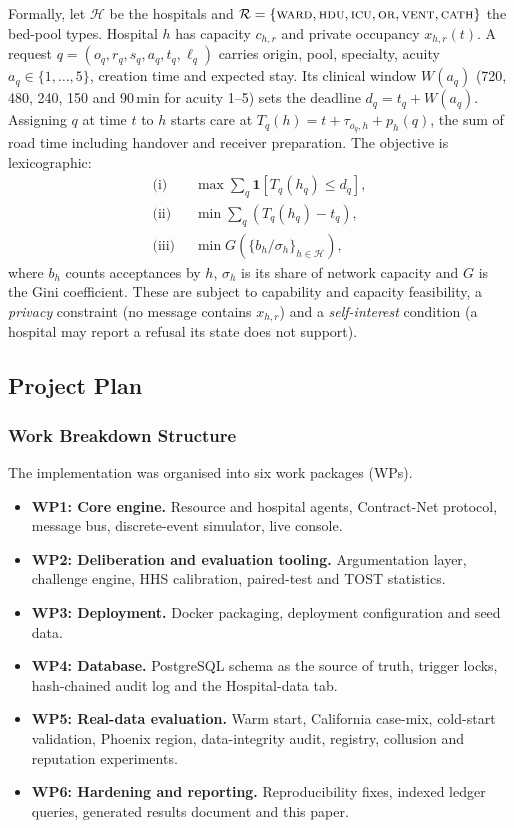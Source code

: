 Formally, let $\mathcal{H}$ be the hospitals and $\mathcal{R}=\{\textsc{ward},\textsc{hdu},\textsc{icu},\textsc{or},\textsc{vent},\textsc{cath}\}$ the bed-pool types. Hospital $h$ has capacity $c_{h,r}$ and private occupancy $x_{h,r}(t)$. A request $q=(o_q,r_q,s_q,a_q,t_q,\ell_q)$ carries origin, pool, specialty, acuity $a_q\in\{1,\dots,5\}$, creation time and expected stay. Its clinical window $W(a_q)$ (720, 480, 240, 150 and 90\,min for acuity 1--5) sets the deadline $d_q=t_q+W(a_q)$. Assigning $q$ at time $t$ to $h$ starts care at $T_q(h)=t+\tau_{o_q,h}+p_h(q)$, the sum of road time including handover and receiver preparation. The objective is lexicographic:
\begin{align}
  \text{(i)}\;\; & \max \textstyle\sum_{q} \mathbf{1}[T_q(h_q) \le d_q], \label{eq:obj1}\\
  \text{(ii)}\;\; & \min \textstyle\sum_{q} (T_q(h_q) - t_q), \label{eq:obj2}\\
  \text{(iii)}\;\; & \min G(\{b_h/\sigma_h\}_{h\in\mathcal{H}}), \label{eq:obj3}
\end{align}
where $b_h$ counts acceptances by $h$, $\sigma_h$ is its share of network capacity and $G$ is the Gini coefficient. These are subject to capability and capacity feasibility, a \emph{privacy} constraint (no message contains $x_{h,r}$) and a \emph{self-interest} condition (a hospital may report a refusal its state does not support).

\subsection{Project Plan}
\label{sec:plan}
\subsubsection{Work Breakdown Structure}
The implementation was organised into six work packages (WPs).
\begin{itemize}
\setlength{\itemsep}{1pt}
\item \textbf{WP1: Core engine.} Resource and hospital agents, Contract-Net protocol, message bus, discrete-event simulator, live console.
\item \textbf{WP2: Deliberation and evaluation tooling.} Argumentation layer, challenge engine, HHS calibration, paired-test and TOST statistics.
\item \textbf{WP3: Deployment.} Docker packaging, deployment configuration and seed data.
\item \textbf{WP4: Database.} PostgreSQL schema as the source of truth, trigger locks, hash-chained audit log and the Hospital-data tab.
\item \textbf{WP5: Real-data evaluation.} Warm start, California case-mix, cold-start validation, Phoenix region, data-integrity audit, registry, collusion and reputation experiments.
\item \textbf{WP6: Hardening and reporting.} Reproducibility fixes, indexed ledger queries, generated results document and this paper.
\end{itemize}

